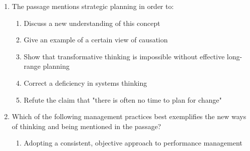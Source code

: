 \documentclass[12pt]{article}
\begin{document}
\begin{enumerate}[label=\textbf{\arabic*.}]
\begin{multicols}{2}
\begin{enumerate}[label=(\Alph*)]
\item Is in the best position to offer unbiased advice to leaders of the organization

\item Is not likely to achieve an adequate understanding of organizational leadership

\item Is more likely to view the organization as a machine rather than as a living system

\item Is more likely to view the organization as a living system rather than a machine

\end{enumerate}

\end{multicols}

\item The passage mentions strategic planning in order to:

\begin{multicols}{2}

\begin{enumerate}[label=(\Alph*)]

\item Discuss a new understanding of this concept

\item Give an example of a certain view of causation

\item Show that transformative thinking is impossible without effective long-range planning

\item Correct a deficiency in systems thinking

\item Refute the claim that "there is often no time to plan for change"

\end{enumerate}

\end{multicols}

\item Which of the following management practices best exemplifies the new ways of thinking and being mentioned in the passage?

\begin{multicols}{2}

\begin{enumerate}[label=(\Alph*)]

\item Adopting a consistent, objective approach to performance management


\end{enumerate}
\end{multicols}
\end{enumerate}
\end{document}
